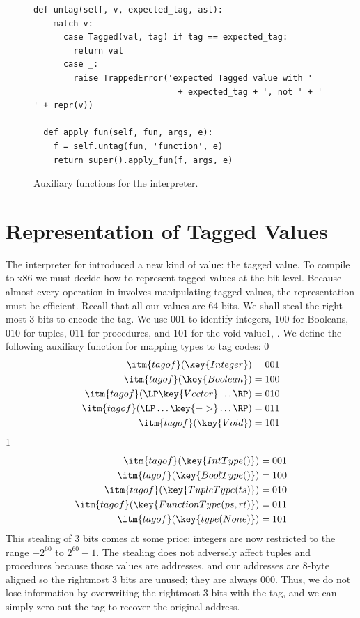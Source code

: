 \documentclass[7x10]{TimesAPriori_MIT}%
\def\racketEd{0}
\def\pythonEd{1}
\providecommand{\BookEdition}{1}
\let\edition\BookEdition
\newcommand{\pythonColor}[0]{}
\newcommand{\python}[1]{{\if\edition\pythonEd\pythonColor #1\fi}}
\numberwithin{theorem}{chapter}
\numberwithin{definition}{chapter}
\numberwithin{equation}{chapter}
\begin{document}
\begin{figure}[tbp]
\begin{tcolorbox}[colback=white]
{\begin{lstlisting}[basicstyle=\ttfamily\footnotesize]
  def untag(self, v, expected_tag, ast):
    match v:
      case Tagged(val, tag) if tag == expected_tag:
        return val
      case _:
        raise TrappedError('expected Tagged value with '
                             + expected_tag + ', not ' + ' ' + repr(v))

  def apply_fun(self, fun, args, e):
    f = self.untag(fun, 'function', e)
    return super().apply_fun(f, args, e)
\end{lstlisting}
\fi}
  \end{tcolorbox}

  \caption{Auxiliary functions for the \LangDyn{} interpreter.}
\label{fig:interp-Ldyn-aux}
\end{figure}


\section{Representation of Tagged Values}

The interpreter for \LangDyn{} introduced a new kind of value: the
tagged value. To compile \LangDyn{} to x86 we must decide how to
represent tagged values at the bit level. Because almost every
operation in \LangDyn{} involves manipulating tagged values, the
representation must be efficient. Recall that all our values are 64
bits.  We shall steal the right-most $3$ bits to encode the tag.  We use
$001$ to identify integers, $100$ for Booleans, $010$ for tuples,
$011$ for procedures, and $101$ for the void value\python{,
  }. We define the following auxiliary function for mapping
types to tag codes:
%
{\if\edition\racketEd
\begin{align*}
\itm{tagof}(\key{Integer}) &= 001 \\
\itm{tagof}(\key{Boolean}) &= 100 \\
\itm{tagof}(\LP\key{Vector} \ldots\RP) &= 010 \\
\itm{tagof}(\LP\ldots \key{->} \ldots\RP) &= 011 \\
\itm{tagof}(\key{Void}) &= 101
\end{align*}
\fi}
{\if\edition\pythonEd\pythonColor
\begin{align*}
\itm{tagof}(\key{IntType()}) &= 001 \\
\itm{tagof}(\key{BoolType()}) &= 100 \\
\itm{tagof}(\key{TupleType(ts)}) &= 010 \\
\itm{tagof}(\key{FunctionType(ps, rt)}) &= 011 \\
\itm{tagof}(\key{type(None)}) &= 101
\end{align*}
\fi}
%
This stealing of 3 bits comes at some price: integers are now restricted
to the range $-2^{60}$ to $2^{60}-1$. The stealing does not adversely
affect tuples and procedures because those values are addresses, and
our addresses are 8-byte aligned so the rightmost 3 bits are unused;
they are always $000$. Thus, we do not lose information by overwriting
the rightmost 3 bits with the tag, and we can simply zero out the tag
to recover the original address.
\end{document}

